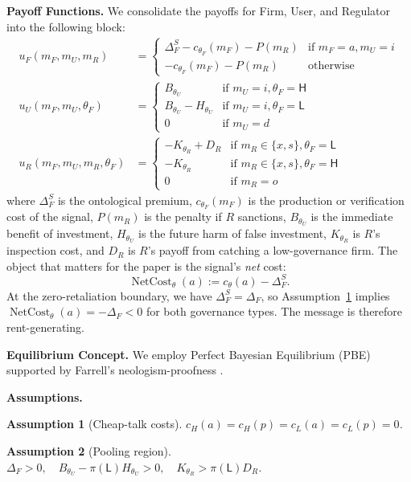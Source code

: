 \documentclass[preprint,authoryear]{elsarticle}
\newtheorem{assumption}{Assumption}
\theoremstyle{definition}
\theoremstyle{plain}
\begin{document}
\textbf{Payoff Functions.} 
We consolidate the payoffs for Firm, User, and Regulator into the following block:
\begin{align*}
u_F(m_F, m_U, m_R) &= 
\begin{cases}
\Delta_F^S - c_{\theta_F}(m_F) - P(m_R) & \text{if } m_F=a, m_U=i \\
- c_{\theta_F}(m_F) - P(m_R) & \text{otherwise}
\end{cases} \\
u_U(m_F, m_U, \theta_F) &= 
\begin{cases}
B_{\theta_U} & \text{if } m_U=i, \theta_F=\mathsf{H} \\
B_{\theta_U} - H_{\theta_U} & \text{if } m_U=i, \theta_F=\mathsf{L} \\
0 & \text{if } m_U=d
\end{cases} \\
u_R(m_F, m_U, m_R, \theta_F) &=
\begin{cases}
-K_{\theta_R} + D_R & \text{if } m_R \in \{x,s\}, \theta_F=\mathsf{L} \\
-K_{\theta_R} & \text{if } m_R \in \{x,s\}, \theta_F=\mathsf{H} \\
0 & \text{if } m_R = o
\end{cases}
\end{align*}
where $\Delta_F^S$ is the ontological premium, $c_{\theta_F}(m_F)$ is the production or verification cost of the signal, $P(m_R)$ is the penalty if $R$ sanctions, $B_{\theta_U}$ is the immediate benefit of investment, $H_{\theta_U}$ is the future harm of false investment, $K_{\theta_R}$ is $R$'s inspection cost, and $D_R$ is $R$'s payoff from catching a low-governance firm.  The object that matters for the paper is the signal's \emph{net} cost:
\[
\operatorname{NetCost}_{\theta}(a)
:=
c_{\theta}(a)-\Delta_F^S .
\]
At the zero-retaliation boundary, we have $\Delta_F^S=\Delta_F$, so Assumption~\ref{ass:cheap-talk} implies $\operatorname{NetCost}_{\theta}(a)=-\Delta_F<0$ for both governance types. The message is therefore rent-generating.

\textbf{Equilibrium Concept.} We employ Perfect Bayesian Equilibrium (PBE) \citep{kreps_wilson1982} supported by Farrell's neologism-proofness \citep{farrell1993}.

\textbf{Assumptions.}
\begin{assumption}[Cheap-talk costs]
\label{ass:cheap-talk}
$c_H(a)=c_H(p)=c_L(a)=c_L(p)=0$.
\end{assumption}
\begin{assumption}[Pooling region]
\label{ass:pooling}
$\Delta_F > 0, \quad B_{\theta_U} - \pi(\mathsf{L})H_{\theta_U} > 0, \quad K_{\theta_R} > \pi(\mathsf{L})D_R$.
\end{assumption}
\end{document}

